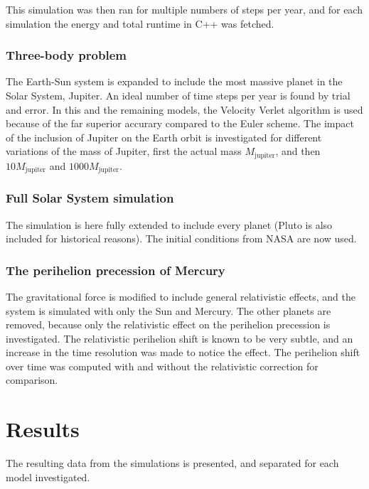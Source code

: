 \documentclass[aps,reprint]{revtex4-1}
\begin{document}
This simulation was then ran for multiple numbers of steps per year, and for
each simulation the energy and total runtime in C++ was fetched.
\subsubsection{Three-body problem}
The Earth-Sun system is expanded to include the most massive planet in the Solar System, Jupiter.
An ideal number of time steps per year is found by trial and error. In this and the remaining models, the Velocity
Verlet algorithm is used because of the far superior accurary compared to the
Euler scheme. The impact of the inclusion of Jupiter on the Earth orbit is investigated
for different variations of the mass of Jupiter, first the actual mass $M_\text{jupiter}$,
and then $10 M_\text{jupiter}$ and $1000 M_\text{jupiter}$.
\subsubsection{Full Solar System simulation}
The simulation is here fully extended to include every planet (Pluto is also included
for historical reasons). The initial conditions from NASA are now used.
\subsubsection{The perihelion precession of Mercury}
The gravitational force is modified to include general relativistic effects, and
the system is simulated with only the Sun and Mercury. The other planets are removed,
because only the relativistic effect on the perihelion precession is investigated.
The relativistic perihelion shift is known to be very subtle, and an increase in the time resolution
was made to notice the effect. The perihelion shift over time was computed with
and without the relativistic correction for comparison.
\section{Results}
The resulting data from the simulations is presented, and separated for each
model investigated.
\label{sec:results}
\end{document}

